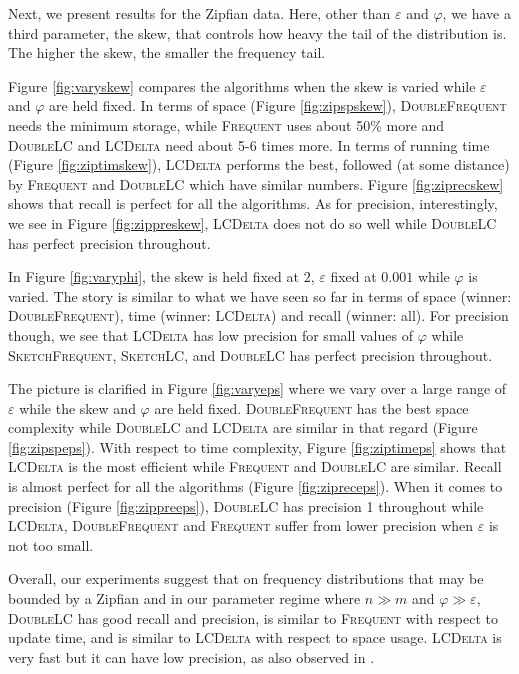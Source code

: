 \documentclass[sigconf,review=true,anonymous=true,screen]{acmart}
\newcommand{\eps}{\varepsilon}
\renewcommand{\phi}{\varphi}
\begin{document}
Next, we present results for the Zipfian data. Here, other than $\eps$ and $\phi$, we have a third parameter, the skew, that controls how heavy the tail of the distribution is. The higher the skew, the smaller the frequency tail.

Figure \ref{fig:varyskew} compares the algorithms when the skew is varied while $\eps$ and $\phi$ are held fixed. In terms of space (Figure \ref{fig:zipspskew}), \textsc{DoubleFrequent} needs the minimum storage, while \textsc{Frequent} uses about 50\% more and \textsc{DoubleLC} and \textsc{LCDelta} need about 5-6 times more. In terms of running time (Figure \ref{fig:ziptimskew}), \textsc{LCDelta} performs the best, followed (at some distance) by \textsc{Frequent} and \textsc{DoubleLC} which have similar numbers. Figure \ref{fig:ziprecskew} shows that recall is perfect for all the algorithms. As for precision, interestingly, we see in Figure \ref{fig:zippreskew}, \textsc{LCDelta} does not do so well while \textsc{DoubleLC} has perfect precision throughout.

In Figure \ref{fig:varyphi}, the skew is held fixed at $2$, $\eps$ fixed at $0.001$ while $\phi$ is varied. The story is similar to what we have seen so far in terms of space (winner: \textsc{DoubleFrequent}), time (winner: \textsc{LCDelta}) and recall (winner: all). For precision though, we see that \textsc{LCDelta} has low precision for small values of $\phi$ while \textsc{SketchFrequent}, \textsc{SketchLC}, and \textsc{DoubleLC} has perfect precision throughout. 

The picture is clarified in Figure \ref{fig:varyeps} where we vary over a large range of $\eps$ while the skew and $\phi$ are held fixed. \textsc{DoubleFrequent} has the best space complexity while \textsc{DoubleLC} and \textsc{LCDelta} are similar in that regard (Figure \ref{fig:zipspeps}). With respect to time complexity, Figure \ref{fig:ziptimeps} shows that \textsc{LCDelta} is the most efficient while \textsc{Frequent} and \textsc{DoubleLC} are similar. Recall is almost perfect for all the algorithms (Figure \ref{fig:zipreceps}). When it comes to precision (Figure \ref{fig:zippreeps}), \textsc{DoubleLC} has precision 1 throughout while \textsc{LCDelta}, \textsc{DoubleFrequent} and \textsc{Frequent} suffer from lower precision when $\eps$ is not too small. 

Overall, our experiments suggest that on frequency distributions that may be bounded by a Zipfian and in our parameter regime where $n \gg m$ and $\phi \gg \eps$, \textsc{DoubleLC} has good recall and precision, is similar to \textsc{Frequent} with respect to update time, and is similar to \textsc{LCDelta} with respect to space usage. \textsc{LCDelta} is very fast but it can have low precision, as also observed in \cite{FrequentSurvey}.
\end{document}
